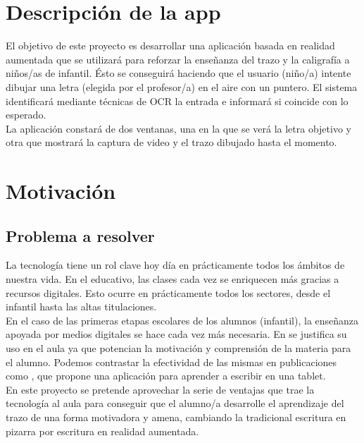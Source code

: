\documentclass[12pt,spanish]{article}
\begin{document}
\section{Descripción de la app}

El objetivo de este proyecto es desarrollar una aplicación basada en realidad aumentada que se utilizará para reforzar la enseñanza del trazo y la caligrafía a niños/as de infantil. Ésto se conseguirá haciendo que el usuario (niño/a) intente dibujar una letra (elegida por el profesor/a) en el aire con un puntero. El sistema identificará mediante técnicas de OCR la entrada e informará si coincide con lo esperado.\\

La aplicación constará de dos ventanas, una en la que se verá la letra objetivo y otra que mostrará la captura de video y el trazo dibujado hasta el momento.\\


\section{Motivación}

\subsection{Problema a resolver}
\label{problema}

La tecnología tiene un rol clave hoy día en prácticamente todos los ámbitos de nuestra vida. En el educativo, las clases cada vez se enriquecen más gracias a recursos digitales. Esto ocurre en prácticamente todos los sectores, desde el infantil hasta las altas titulaciones. \\

En el caso de las primeras etapas escolares de los alumnos (infantil), la enseñanza apoyada por medios digitales se hace cada vez más necesaria. En \cite{Robles-Melendez} se justifica su uso en el aula ya que potencian la motivación y comprensión de la materia para el alumno. Podemos contrastar la efectividad de las mismas en publicaciones como \cite{Bonneton-Botte2020}, que propone una aplicación para aprender a escribir en una tablet.\\

En este proyecto se pretende aprovechar la serie de ventajas que trae la tecnología al aula para conseguir que el alumno/a desarrolle el aprendizaje del trazo de una forma motivadora y amena, cambiando la tradicional escritura en pizarra por escritura en realidad aumentada.
\end{document}
